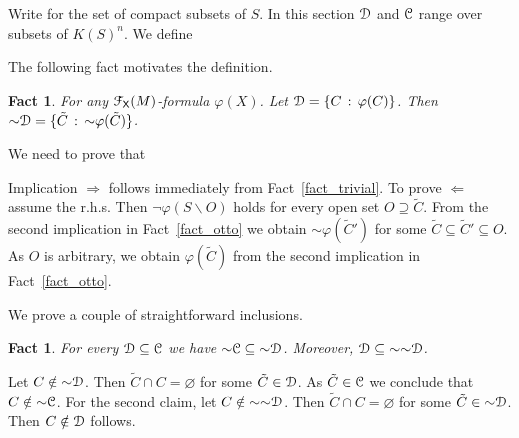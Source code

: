 \documentclass{amsproc}
\makeatletter
\newcounter{thm}
\theoremstyle{mio}
\newtheorem{fact}[thm]{Fact}\tcolorboxenvironment{fact}{mythm}
\providecommand{\proofNameStyle}{\bfseries}
\renewenvironment{proof}[1][\proofname]{\par
  \pushQED{\qed}%
  \normalfont%
  \trivlist
  \item[\hskip\labelsep
        \proofNameStyle
    #1\@addpunct{.}]\ignorespaces
}{%
  \popQED\endtrivlist\@endpefalse
}
\renewcommand*{\emph}[1]{%
   \smash{\tikz[baseline]\node[rectangle, fill=teal!25, rounded corners, inner xsep=0.5ex, inner ysep=0.2ex, anchor=base, minimum height = 2.7ex]{\strut #1};}}
\makeatother
\begin{document}
Write \emph{$K(S)$\/} for the set of compact subsets of $S$.
In this section ${\EuScript D}$ and ${\EuScript C}$ range over subsets of $K(S)^n$.
We define 

\ceq{\hfill\emph{${\sim}{\EuScript D}$}}{=}{\big\{\tilde C\ :\ \tilde C\cap C\neq\varnothing\text{ for every }C\in{\EuScript D}\big\}.}

The following fact motivates the definition.

\begin{fact}\label{fact_~definibile}
  For any ${\EuScript F}_{\sf X}(M)$-formula $\varphi(X)$.
  Let ${\EuScript D}=\{C\,:\,\varphi(C)\}$.
  Then ${\sim}{\EuScript D}=\{\tilde C\,:\,{\sim}\varphi(\tilde C)\}$.
\end{fact}

\begin{proof}
  We need to prove that 


  Implication $\Rightarrow$ follows immediately from Fact~\ref{fact_trivial}.
  To prove  $\Leftarrow$ assume the r.h.s.
  Then $\neg\varphi(S\smallsetminus O)$ holds for every open set  $O\supseteq\tilde C$.
  From the second implication in Fact~\ref{fact_otto} we obtain ${\sim}\varphi(\tilde C')$ for some $\tilde C\subseteq\tilde C'\subseteq O$.
  As $O$ is arbitrary, we obtain $\varphi(\tilde C)$ from the second implication in  Fact~\ref{fact_otto}.
\end{proof}

We prove a couple of straightforward inclusions.

\begin{fact}\label{fact_~inclusione}
  For every ${\EuScript D}\subseteq{\EuScript C}$ we have ${\sim}{\EuScript C}\subseteq{\sim}{\EuScript D}$.  
  Moreover, ${\EuScript D}\subseteq{\sim}{\sim}{\EuScript D}$.
\end{fact}

\begin{proof}
  Let $C\notin{\sim}{\EuScript D}$.
  Then $\tilde C\cap C=\varnothing$ for some $\tilde C\in{\EuScript D}$.
  As  $\tilde C\in{\EuScript C}$ we conclude that  $C\notin{\sim}{\EuScript C}$.
  For the second claim, let $C\notin{\sim}{\sim}{\EuScript D}$.
  Then $\tilde C\cap C=\varnothing$ for some $\tilde C\in{\sim}{\EuScript D}$.
  Then $C\notin{\EuScript D}$ follows.
\end{proof}
\end{document}
